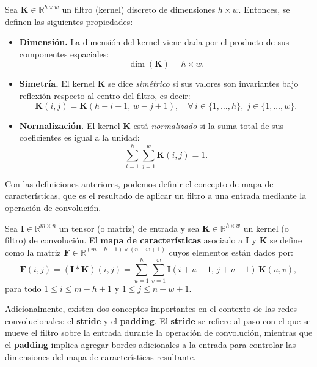 \begin{definition}
    Sea $\mathbf{K} \in \mathbb{R}^{h \times w}$ un filtro (kernel) discreto de dimensiones $h \times w$. Entonces, se definen las siguientes propiedades:

    \begin{itemize}
        \item \textbf{Dimensión.}
              La dimensión del kernel viene dada por el producto de sus componentes espaciales:
              \[
                  \dim(\mathbf{K}) = h \times w.
              \]

        \item \textbf{Simetría.}
              El kernel $\mathbf{K}$ se dice \emph{simétrico} si sus valores son invariantes bajo reflexión respecto al centro del filtro, es decir:
              \[
                  \mathbf{K}(i,j) = \mathbf{K}(h - i + 1,\, w - j + 1),
                  \quad \forall\, i \in \{1, \dots, h\},\; j \in \{1, \dots, w\}.
              \]

        \item \textbf{Normalización.}
              El kernel $\mathbf{K}$ está \emph{normalizado} si la suma total de sus coeficientes es igual a la unidad:
              \[
                  \sum_{i=1}^{h} \sum_{j=1}^{w} \mathbf{K}(i,j) = 1.
              \]
    \end{itemize}
\end{definition}

Con las definiciones anteriores, podemos definir el concepto de mapa de características, que es el resultado de aplicar un filtro a una entrada mediante la operación de convolución.

\begin{definition}
    Sea $\mathbf{I} \in \mathbb{R}^{m \times n}$ un tensor (o matriz) de entrada y sea $\mathbf{K} \in \mathbb{R}^{h \times w}$ un kernel (o filtro) de convolución.
    El \textbf{mapa de características} asociado a $\mathbf{I}$ y $\mathbf{K}$ se define como la matriz $\mathbf{F} \in \mathbb{R}^{(m-h+1) \times (n-w+1)}$ cuyos elementos están dados por:
    \[
        \mathbf{F}(i,j) = (\mathbf{I} \ast \mathbf{K})(i,j)
        = \sum_{u=1}^{h} \sum_{v=1}^{w} \mathbf{I}(i+u-1,\, j+v-1)\,\mathbf{K}(u,v),
    \]
    para todo $1 \leq i \leq m-h+1$ y $1 \leq j \leq n-w+1$.
\end{definition}

Adicionalmente, existen dos conceptos importantes en el contexto de las redes convolucionales: el \textbf{stride} y el \textbf{padding}.
El \textbf{stride} se refiere al paso con el que se mueve el filtro sobre la entrada durante la operación de convolución, mientras que el \textbf{padding} implica agregar bordes adicionales a la entrada para controlar las dimensiones del mapa de características resultante.

